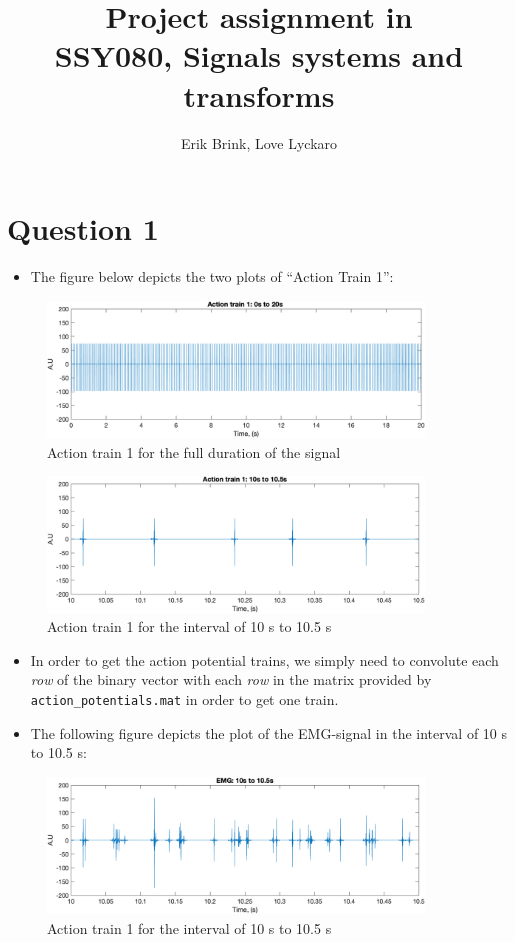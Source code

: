 \documentclass[a4paper, 12pt]{article}
\title{Project assignment in\\
       SSY080, Signals systems and transforms}
\author{Erik Brink, Love Lyckaro}
\begin{document}
\maketitle
{}
\newpage
{}

\section*{Question 1}
  \begin{itemize}
    \item The figure below depicts the two plots of ``Action Train 1'':
  \end{itemize}
  \begin{figure}[H]
    \centering
    \includegraphics[width= 10cm]{at1_0to20.png}
    \caption{Action train 1 for the full duration of the signal}
  \end{figure}
  \begin{figure}[H]
    \centering
    \includegraphics[width= 10cm]{at1_10to105.png}
    \caption{Action train 1 for the interval of 10 s to 10.5 s}
  \end{figure}
  \begin{itemize}
    \item In order to get the action potential trains, we simply need to convolute each \textit{row} of the binary vector with each \textit{row} in the matrix provided by \lstinline{action_potentials.mat} in order to get one train.
    \item The following figure depicts the plot of the EMG-signal in the interval of 10 s to 10.5 s:
  \end{itemize}
  \begin{figure}[H]
    \centering
    \includegraphics[width= 10cm]{emg_10to105.png}
    \caption{Action train 1 for the interval of 10 s to 10.5 s}
  \end{figure}
\end{document}
